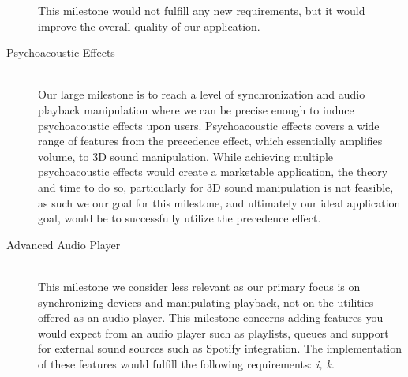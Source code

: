 \begin{description}
        This milestone would not fulfill any new requirements, but it would improve the overall quality of our application.
    \item [Psychoacoustic Effects] \hfill \\
        Our large milestone is to reach a level of synchronization and audio playback manipulation where we can be precise enough to induce psychoacoustic effects upon users.
        Psychoacoustic effects covers a wide range of features from the precedence effect, which essentially amplifies volume, to 3D sound manipulation.
        While achieving multiple psychoacoustic effects would create a marketable application, the theory and time to do so, particularly for 3D sound manipulation is not feasible, as such we our goal for this milestone, and ultimately our ideal application goal, would be to successfully utilize the precedence effect.
    \item [Advanced Audio Player] \hfill \\
        This milestone we consider less relevant as our primary focus is on synchronizing devices and manipulating playback, not on the utilities offered as an audio player.
        This milestone concerns adding features you would expect from an audio player such as playlists, queues and support for external sound sources such as Spotify integration.
        The implementation of these features would fulfill the following requirements: \textit{i, k}.
\end{description}





